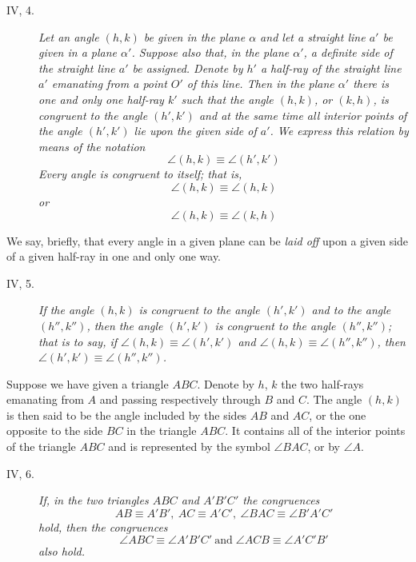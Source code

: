 \documentclass[11pt,oneside]{book}
\begin{document}
\begin{description}
\item[IV, 4.] \emph{Let an angle $(h,k)$ be given in the plane
$\alpha$ and let a straight line $a'$ be given in a plane $\alpha'$.
Suppose also that, in the plane $\alpha'$, a definite side
of the straight line $a'$ be assigned. Denote by $h'$ a
half-ray of the straight line $a'$ emanating from a
point $O'$ of this line. Then in the plane $\alpha'$ there
is one and only one half-ray $k'$ such that the angle
$(h,k)$, or $(k,h)$, is congruent to the angle $(h',k')$
and at the same time all interior points of the angle
$(h',k')$ lie upon the given side of $a'$. We express
this relation by means of the notation
\[
   \angle (h,k) \equiv \angle (h',k')
\]
Every angle is congruent to itself; that is,
\[
\angle (h,k) \equiv \angle (h,k)
\]
or
\[
\angle (h,k) \equiv \angle (k,h)
\]
}
\end{description}

We say, briefly, that every angle in a given plane
can be \emph{laid off} upon a given side of a given half-ray in
one and only one way.

\begin{description}
\item[IV, 5.] \emph{If the angle $(h,k)$ is congruent to the angle
$(h',k')$ and to the angle $(h'',k'')$, then the angle
$(h',k')$ is congruent to the angle $(h'',k'')$; that is
to say, if $\angle (h, k) \equiv \angle (h', k')$ and
$\angle (h, k) \equiv \angle (h'',k'')$, then
$\angle (h',k') \equiv \angle (h'',k'')$.}
\end{description}

Suppose we have given a triangle $ABC$. Denote
by $h$, $k$ the two half-rays emanating from $A$ and passing
respectively through $B$ and $C$. The angle $(h,k)$
is then said to be the angle included by the sides $AB$
and $AC$, or the one opposite to the side $BC$ in the
triangle $ABC$. It contains all of the interior points
of the triangle $ABC$ and is represented by the symbol
$\angle BAC$, or by $\angle A$.

\begin{description}
\item[IV, 6.] \emph{If, in the two triangles $ABC$ and $A'B'C'$
the congruences
\[
AB \equiv A'B', \: AC \equiv A'C', \: \angle BAC \equiv \angle B'A'C'
\]
hold, then the congruences
\[
\angle ABC \equiv \angle A'B'C' \:\mbox{and}\; \angle ACB \equiv \angle A'C'B'
\]
also hold.}
\end{description}
\end{document}

